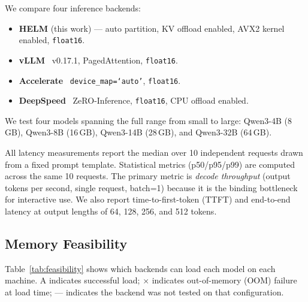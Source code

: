 \documentclass[lettersize,journal]{IEEEtran}
\begin{document}
We compare four inference backends:

\begin{itemize}
  \item \textbf{HELM} (this work) --- auto partition, KV offload enabled,
        AVX2 kernel enabled, \texttt{float16}.
  \item \textbf{vLLM}~\cite{vllm} v0.17.1, PagedAttention, \texttt{float16}.
  \item \textbf{Accelerate}~\cite{accelerate} \texttt{device\_map=`auto'},
        \texttt{float16}.
  \item \textbf{DeepSpeed}~\cite{deepspeed} ZeRO-Inference,
        \texttt{float16}, CPU offload enabled.
\end{itemize}

We test four models spanning the full range from small to large:
Qwen3-4B (8\,GB), Qwen3-8B (16\,GB), Qwen3-14B (28\,GB),
and Qwen3-32B (64\,GB).

All latency measurements report the median over 10 independent requests
drawn from a fixed prompt template. Statistical metrics (p50/p95/p99) are
computed across the same 10 requests. The primary metric is
\emph{decode throughput} (output tokens per second, single request, batch=1)
because it is the binding bottleneck for interactive use. We also report
time-to-first-token (TTFT) and end-to-end latency at output lengths of
64, 128, 256, and 512 tokens.

\subsection{Memory Feasibility}
\label{sec:feasibility}

Table~\ref{tab:feasibility} shows which backends can load each model on each
machine. A \checkmark{} indicates successful load; $\times$ indicates
out-of-memory (OOM) failure at load time; --- indicates the backend was not
tested on that configuration.
\end{document}
